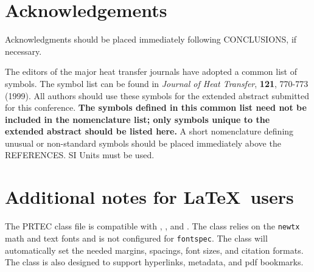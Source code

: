 \documentclass[upint,varvw]{prtec}
\begin{document}
\section*{Acknowledgements} 
Acknowledgments should be placed immediately following CONCLUSIONS, if necessary.



{\color{red}The editors of the major heat transfer journals have adopted a common list of symbols. The symbol list can be found in \textit{Journal of Heat Transfer}, \textbf{121}, 770-773 (1999).  All authors should use these symbols for the extended abstract submitted for this conference. \textbf{The symbols defined in this common list need not be included in the nomenclature list; only symbols unique to the extended abstract should be listed here.} A short nomenclature defining unusual or non-standard symbols should be placed immediately above the REFERENCES. SI Units must be used.}

\begin{nomenclature}


\end{nomenclature}



\nocite{*} %





\appendix

\section{Additional notes for \LaTeX\ users}
The PRTEC class file is compatible with , , and . The class relies on the \texttt{newtx} math and text fonts and is not configured for \texttt{fontspec}. The class will automatically set the needed margins, spacings, font sizes, and citation formats. The class is also designed to support hyperlinks, metadata, and pdf bookmarks.
\end{document}

